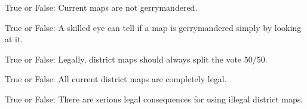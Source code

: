 \documentclass[nooutcomes,noauthor]{ximera}
\author{Bart Snapp}
\begin{document}
\maketitle




\begin{exercise} True or False:
  Current maps are not gerrymandered.
\end{exercise}

\begin{exercise} True or False:
  A skilled eye can tell if a map is gerrymandered simply by looking
  at it.
\end{exercise}

\begin{exercise} True or False:
 Legally, district maps should always split the vote $50/50$.
\end{exercise}


\begin{exercise}
  True or False: All current district maps are completely legal.
\end{exercise}


\begin{exercise}
  True or False: There are serious legal consequences for using
  illegal district maps.
\end{exercise}



\end{document}
